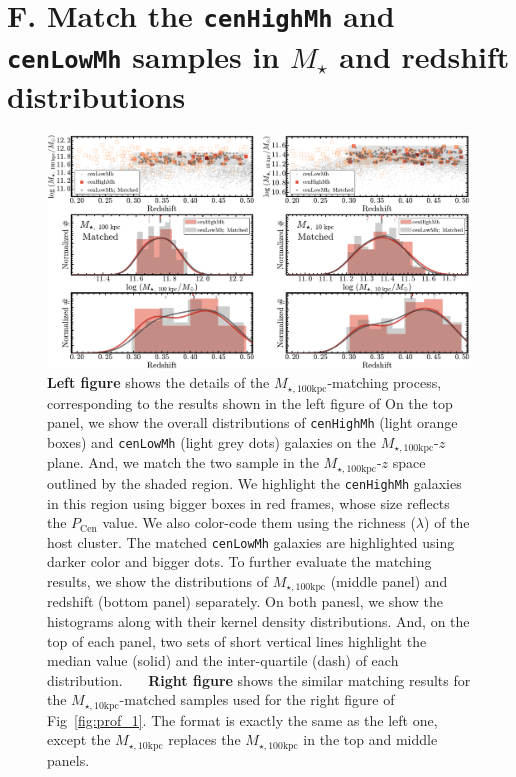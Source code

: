 \documentclass[a4paper,fleqn,usenatbib]{mnras}
\def\rbcg{\texttt{cenHighMh}}
\def\nbcg{\texttt{cenLowMh}}
\def\mstar{{$M_{\star}$}}
\def\minn{{$M_{\star,10\mathrm{kpc}}$}}
\def\mtot{{$M_{\star,100\mathrm{kpc}}$}}
\begin{document}

\section{F. Match the \rbcg{} and \nbcg{} samples in \mstar{} and redshift distributions}
    \label{app:match}

\begin{figure}
    \centering 
    \includegraphics[width=\textwidth]{fig/redbcg_match}
    \caption{
        \textbf{Left figure} shows the details of the \mtot{}-matching process, 
        corresponding to the results shown in the left figure of   
        On the top panel, we show the overall distributions of \rbcg{} (light orange boxes) 
        and \nbcg{} (light grey dots) galaxies on the \mtot{}-$z$ plane.  
        And, we match the two sample in the \mtot{}-$z$ space outlined by the shaded region.
        We highlight the \rbcg{} galaxies in this region using bigger boxes in red frames, 
        whose size reflects the $P_{\mathrm{Cen}}$ value.  
        We also color-code them using the richness ($\lambda$) of the host cluster. 
        The matched \nbcg{} galaxies are highlighted using darker color and bigger dots. 
        To further evaluate the matching results, we show the distributions of \mtot{} 
        (middle panel) and redshift (bottom panel) separately. 
        On both panesl, we show the histograms along with their kernel density 
        distributions.  
        And, on the top of each panel, two sets of short vertical lines highlight the median 
        value (solid) and the inter-quartile (dash) of each distribution.~~~
        \textbf{Right figure} shows the similar matching results for the \minn{}-matched
        samples used for the right figure of Fig~\ref{fig:prof_1}.
        The format is exactly the same as the left one, except the \minn{} replaces the 
        \mtot{} in the top and middle panels.}
    \label{fig:match}
\end{figure}
    
\end{document}
